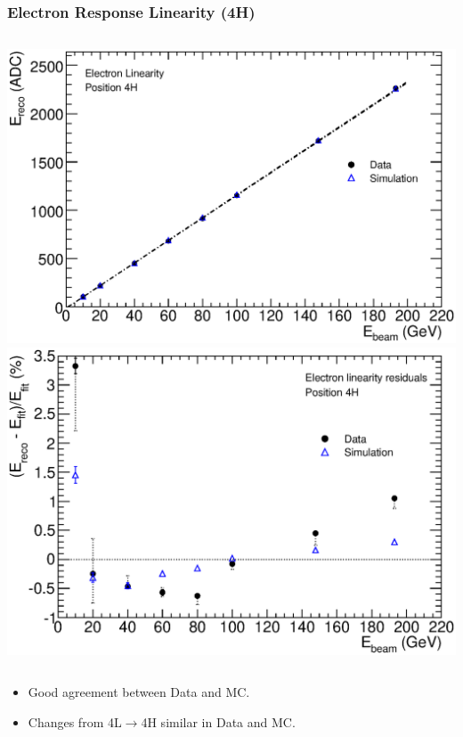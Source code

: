 \documentclass[10pt]{beamer}
\begin{document}
\begin{frame}\frametitle{Electron Response Linearity (4H)}
\begin{columns}
\includegraphics[width=0.95\linewidth,angle=0]{FCalTB_plots/electron_linearity_4H.eps}
\includegraphics[width=0.95\linewidth,angle=0]{FCalTB_plots/electron_linearity_residuals_4H.eps}
\end{columns}

\begin{itemize}


\item Good agreement between Data and MC.
\item Changes from 4L$\rightarrow$4H similar in Data and MC.
\end{itemize}
\end{frame}
\end{document}
